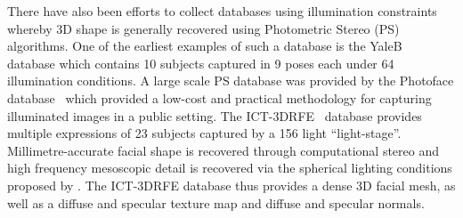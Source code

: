 There have also been efforts to collect databases using illumination constraints
whereby 3D shape is generally recovered using Photometric Stereo (PS) 
algorithms. One of the earliest examples of such a database is the 
YaleB~\cite{RefWorks:314} database which contains 10 subjects captured in 
9 poses each under 64 illumination conditions. A large scale PS database was
provided by the Photoface database~\cite{RefWorks:293} which provided a low-cost
and practical methodology for capturing illuminated images in a public setting.
The ICT-3DRFE~\cite{stratou2012exploring} database provides multiple expressions
of 23 subjects captured by a 156 light ``light-stage''. Millimetre-accurate
facial shape is recovered through computational stereo and high frequency 
mesoscopic detail is recovered via the spherical lighting conditions proposed
by \citet{ma2007rapid}. The ICT-3DRFE database thus provides a dense 
3D facial mesh, as well as a diffuse and specular texture map and diffuse and
specular normals.
